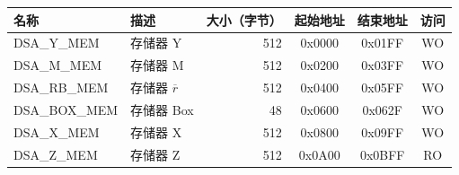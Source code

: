 \begin{longtable}{ | p{3cm} | p{3cm} | r | c | c | c | }
\hline
\rowcolor{lightgray}
名称 & 描述 &  大小（字节） & 起始地址 & 结束地址 & 访问 \\ \hline
{DSA\_Y\_MEM}\label{DSAYMEM}  & 存储器 Y  & 512  & 0x0000 & 0x01FF & WO \\ \hline
{DSA\_M\_MEM}\label{DSAMMEM}  & 存储器 M  & 512  & 0x0200 & 0x03FF & WO \\ \hline
{DSA\_RB\_MEM}\label{DSARBMEM}  & 存储器 $\overline{r}$  & 512  & 0x0400 & 0x05FF & WO \\ \hline
{DSA\_BOX\_MEM}\label{DSABOXMEM}  & 存储器 Box  & 48  & 0x0600 & 0x062F & WO \\ \hline
{DSA\_X\_MEM}\label{DSAXMEM}  & 存储器 X  & 512  & 0x0800 & 0x09FF & WO \\ \hline
{DSA\_Z\_MEM}\label{DSAZMEM}  & 存储器 Z  & 512  & 0x0A00 & 0x0BFF & RO \\ \hline
\end{longtable}
